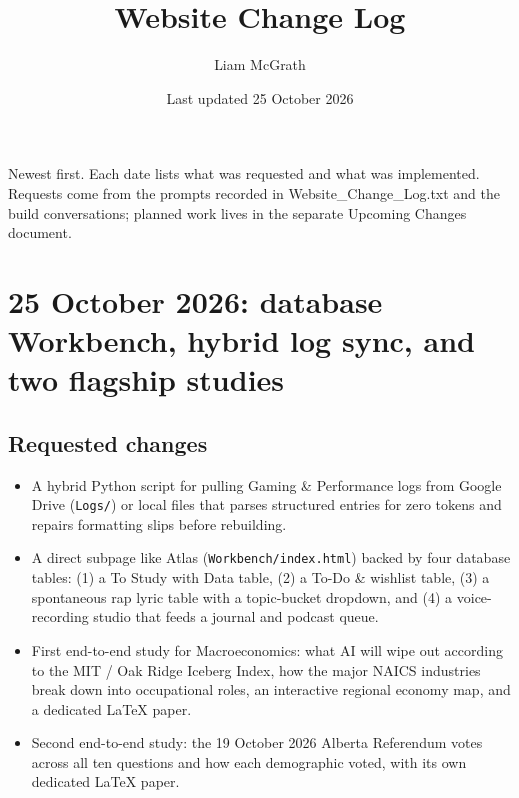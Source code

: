 \documentclass[11pt]{article}
\title{Website Change Log}
\author{Liam McGrath}
\date{Last updated 25 October 2026}
\begin{document}
\maketitle

Newest first. Each date lists what was requested and what was implemented. Requests come from the prompts recorded in Website\_Change\_Log.txt and the build conversations; planned work lives in the separate Upcoming Changes document.

\section{25 October 2026: database Workbench, hybrid log sync, and two flagship studies}
\subsection{Requested changes}
\begin{itemize}
\item A hybrid Python script for pulling Gaming \& Performance logs from Google Drive (\texttt{Logs/}) or local files that parses structured entries for zero tokens and repairs formatting slips before rebuilding.
\item A direct subpage like Atlas (\texttt{Workbench/index.html}) backed by four database tables: (1) a To Study with Data table, (2) a To-Do \& wishlist table, (3) a spontaneous rap lyric table with a topic-bucket dropdown, and (4) a voice-recording studio that feeds a journal and podcast queue.
\item First end-to-end study for Macroeconomics: what AI will wipe out according to the MIT / Oak Ridge Iceberg Index, how the major NAICS industries break down into occupational roles, an interactive regional economy map, and a dedicated LaTeX paper.
\item Second end-to-end study: the 19 October 2026 Alberta Referendum votes across all ten questions and how each demographic voted, with its own dedicated LaTeX paper.
\end{itemize}
\end{document}
